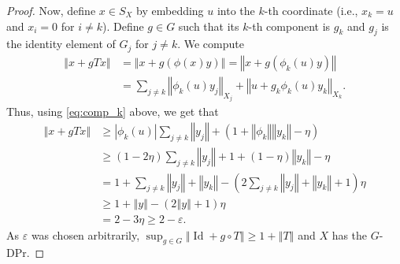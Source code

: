\documentclass[10pt,a4paper]{amsart}
\newcommand{\e}{\varepsilon}
\newcommand{\eps}{\e}
\DeclareMathOperator{\id}{Id}
\newcommand{\norm}[1]{\left\Vert#1\right\Vert}
\begin{document}
\begin{proof}
		Now, define $x \in S_X$ by embedding $u$ into the $k$-th coordinate (i.e., $x_k=u$ and $x_i=0$ for $i \neq k$). Define $g \in G$ such that its $k$-th component is $g_k$ and $g_j$ is the identity element of $G_j$ for $j \neq k$. We compute
		\begin{align*}
			\norm{x + gTx}
			&= \norm{x + g(\phi(x)y)} 
			= \norm{x + g(\phi_k(u)y)} \\
			&= \sum_{j \neq k} \norm{\phi_k(u) y_j}_{X_j} + \norm{u + g_k \phi_k(u) y_k}_{X_k}.
		\end{align*}
		Thus, using \eqref{eq:comp_k} above, we get that
		\begin{align*}
			\norm{x + gTx} 
			&\ge |\phi_k(u)| \sum_{j \neq k} \norm{y_j} + (1 + \norm{\phi_k}\norm{y_k} - \eta)\\
			&\ge (1-2\eta) \sum_{j \neq k} \norm{y_j} + 1 + (1-\eta)\norm{y_k} - \eta\\
			&= 1 + \sum_{j \neq k} \norm{y_j} + \norm{y_k}
			- \left(2\sum_{j \neq k} \norm{y_j} + \norm{y_k} + 1\right)\eta\\
			&\ge 1 + \norm{y} - (2\norm{y} + 1) \eta\\
			&= 2 - 3\eta \ge 2-\eps.
		\end{align*}
		As $\e$ was chosen arbitrarily, $\sup_{g \in G} \norm{\id + g \circ T} \ge 1 + \norm{T}$ and $X$ has the $G$-DPr.
	\end{proof}
\end{document}
